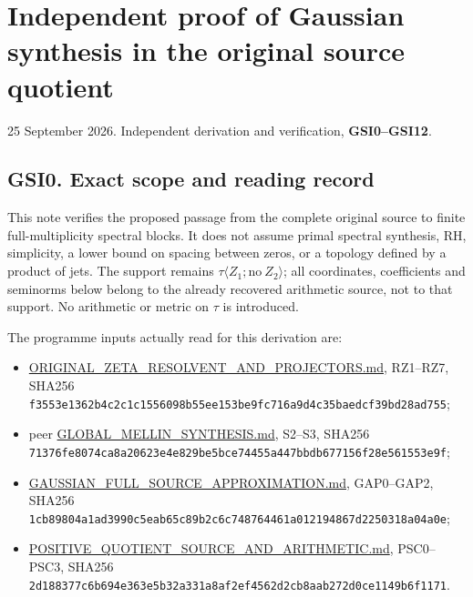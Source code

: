 \section{Independent proof of Gaussian synthesis in the original source
quotient}\label{independent-proof-of-gaussian-synthesis-in-the-original-source-quotient}

25 September 2026. Independent derivation and verification,
\textbf{GSI0--GSI12}.

\subsection{GSI0. Exact scope and reading
record}\label{gsi0.-exact-scope-and-reading-record}

This note verifies the proposed passage from the complete original
source to finite full-multiplicity spectral blocks. It does not assume
primal spectral synthesis, RH, simplicity, a lower bound on spacing
between zeros, or a topology defined by a product of jets. The support
remains \(\tau\langle Z_1;\mathrm{no}\ Z_2\rangle\); all coordinates,
coefficients and seminorms below belong to the already recovered
arithmetic source, not to that support. No arithmetic or metric on
\(\tau\) is introduced.

The programme inputs actually read for this derivation are:

\begin{itemize}
\tightlist
\item
  \href{https://github.com/KokunoYumeto/zeta-function-research-reader/blob/36a82ecca98addb8a98b48204e349737856c7223/workbenches/splitzero-tandem/continuations/20260924-cohomology-weight-and-character-lifts/gct-weight-control/proofs/ORIGINAL_ZETA_RESOLVENT_AND_PROJECTORS.md}{ORIGINAL\_ZETA\_RESOLVENT\_AND\_PROJECTORS.md},
  RZ1--RZ7, SHA256
  \texttt{f3553e1362b4c2c1c1556098b55ee153be9fc716a9d4c35baedcf39bd28ad755};
\item
  peer
  \href{https://github.com/KokunoYumeto/zeta-function-research-reader/blob/36a82ecca98addb8a98b48204e349737856c7223/workbenches/splitzero-tandem/continuations/20260924-cohomology-weight-and-character-lifts/gct-weight-control/proofs/GLOBAL_MELLIN_SYNTHESIS.md}{GLOBAL\_MELLIN\_SYNTHESIS.md},
  S2--S3, SHA256
  \texttt{71376fe8074ca8a20623e4e829be5bce74455a447bbdb677156f28e561553e9f};
\item
  \href{https://github.com/KokunoYumeto/zeta-function-research-reader/blob/main/workbenches/splitzero-tandem/continuations/20260925-full-source-tensor-and-original-divisor/identity/GAUSSIAN_FULL_SOURCE_APPROXIMATION.md}{GAUSSIAN\_FULL\_SOURCE\_APPROXIMATION.md},
  GAP0--GAP2, SHA256
  \texttt{1cb89804a1ad3990c5eab65c89b2c6c748764461a012194867d2250318a04a0e};
\item
  \href{https://github.com/KokunoYumeto/zeta-function-research-reader/blob/36a82ecca98addb8a98b48204e349737856c7223/workbenches/splitzero-tandem/continuations/20260924-cohomology-weight-and-character-lifts/geometric-positive-quotient/POSITIVE_QUOTIENT_SOURCE_AND_ARITHMETIC.md}{POSITIVE\_QUOTIENT\_SOURCE\_AND\_ARITHMETIC.md},
  PSC0--PSC3, SHA256
  \texttt{2d188377c6b694e363e5b32a331a8af2ef4562d2cb8aab272d0ce1149b6f1171}.
\end{itemize}

